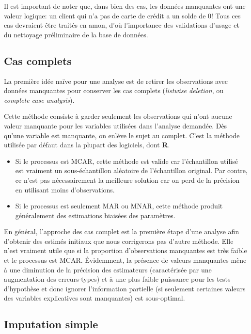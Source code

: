 \documentclass[
  11pt,
  letterpaper,
]{scrbook}
\providecommand{\tightlist}{%
  \setlength{\itemsep}{0pt}\setlength{\parskip}{0pt}}\usepackage{longtable,booktabs,array}
\theoremstyle{definition}
\theoremstyle{remark}
\begin{document}
Il est important de noter que, dans bien des cas, les données manquantes
ont une valeur logique: un client qui n'a pas de carte de crédit a un
solde de 0! Tous ces cas devraient être traités en amon, d'où
l'importance des validations d'usage et du nettoyage préliminaire de la
base de données.

\subsection{Cas complets}\label{cas-complets}

La première idée naïve pour une analyse est de retirer les observations
avec données manquantes pour conserver les cas complets (\emph{listwise
deletion}, ou \emph{complete case analysis}).

Cette méthode consiste à garder seulement les observations qui n'ont
aucune valeur manquante pour les variables utilisées dans l'analyse
demandée. Dès qu'une variable est manquante, on enlève le sujet au
complet. C'est la méthode utilisée par défaut dans la plupart des
logiciels, dont \textbf{R}.

\begin{itemize}
\tightlist
\item
  Si le processus est MCAR, cette méthode est valide car l'échantillon
  utilisé est vraiment un sous-échantillon aléatoire de l'échantillon
  original. Par contre, ce n'est pas nécessairement la meilleure
  solution car on perd de la précision en utilisant moins
  d'observations.
\item
  Si le processus est seulement MAR ou MNAR, cette méthode produit
  généralement des estimations biaisées des paramètres.
\end{itemize}

En général, l'approche des cas complet est la première étape d'une
analyse afin d'obtenir des estimés initiaux que nous corrigerons pas
d'autre méthode. Elle n'est vraiment utile que si la proportion
d'observations manquantes est très faible et le processus est MCAR.
Évidemment, la présence de valeurs manquantes mène à une diminution de
la précision des estimateurs (caractérisée par une augmentation des
erreurs-types) et à une plus faible puissance pour les tests d'hypothèse
et donc ignorer l'information partielle (si seulement certaines valeurs
des variables explicatives sont manquantes) est sous-optimal.

\subsection{Imputation simple}\label{imputation-simple}
\end{document}
